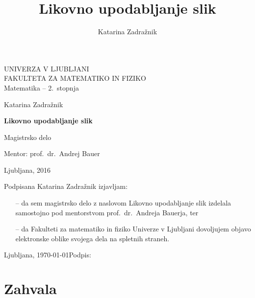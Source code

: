 \documentclass[11pt,a4paper,twoside,slovene]{book}
\author{Katarina Zadražnik}
\title{Likovno upodabljanje slik}
\begin{document}
\frontmatter
\pagestyle{empty}

\begin{flushleft}
\noindent
\textsc{\Large UNIVERZA V LJUBLJANI}\\
\textsc{\Large FAKULTETA ZA MATEMATIKO IN FIZIKO}\\
\medskip
\Large Matematika -- 2.\ stopnja
\end{flushleft}

\vfill

\begin{center}
 {\LARGE Katarina Zadražnik}

  \bigskip
  \medskip
  {\bfseries {\Huge Likovno upodabljanje slik}}

  \bigskip
  \medskip

  {\LARGE Magistrsko delo}
  
  \bigskip
  \medskip
  
  {\Large Mentor: prof.\ dr.\ Andrej Bauer}
\end{center}

\vfill
\vfill
\noindent
{\Large Ljubljana, 2016}

\cleardoublepage

\null
\vfill
\noindent Podpisana {Katarina Zadražnik} izjavljam: %
\begin{itemize}
 \item[--] da sem magistrsko delo z naslovom Likovno upodabljanje slik izdelala samostojno pod mentorstvom {prof.\ dr.\ Andreja Bauerja}, ter %
 \item[--] da Fakulteti za matematiko in fiziko Univerze v Ljubljani dovoljujem objavo elektronske oblike svojega dela na spletnih straneh.
\end{itemize}
Ljubljana, \today \hfill Podpis:\hspace{5cm} %

\cleardoublepage

\chapter*{Zahvala}
\end{document}
